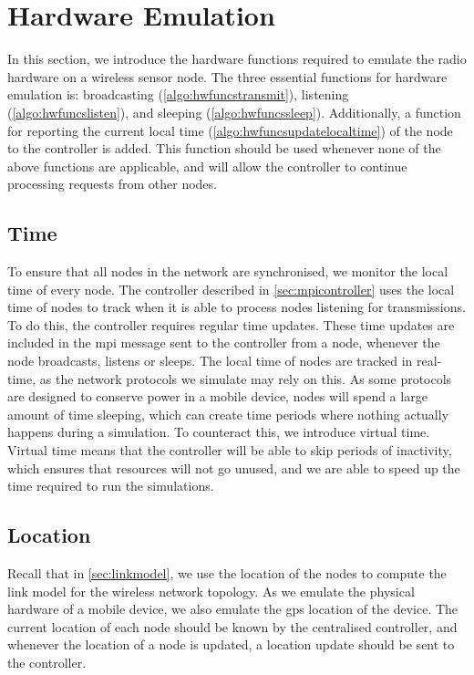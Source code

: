 \newpage
\section{Hardware Emulation}\label{sec:mpiprotocol}
In this section, we introduce the hardware functions required to emulate the radio hardware on a wireless sensor node. The three essential functions for hardware emulation is: broadcasting (\autoref{algo:hwfuncstransmit}), listening (\autoref{algo:hwfuncslisten}), and sleeping (\autoref{algo:hwfuncssleep}). Additionally, a function for reporting the current local time (\autoref{algo:hwfuncsupdatelocaltime}) of the node to the controller is added. This function should be used whenever none of the above functions are applicable, and will allow the controller to continue processing requests from other nodes.

\subsection{Time}\label{sec:mpi:time}
To ensure that all nodes in the network are synchronised, we monitor the local time of every node. The controller described in \autoref{sec:mpicontroller} uses the local time of nodes to track when it is able to process nodes listening for transmissions. To do this, the controller requires regular time updates. These time updates are included in the \acrshort{mpi} message sent to the controller from a node, whenever the node broadcasts, listens or sleeps. The local time of nodes are tracked in real-time, as the network protocols we simulate may rely on this. \smallbreak
As some protocols are designed to conserve power in a mobile device, nodes will spend a large amount of time sleeping, which can create time periods where nothing actually happens during a simulation. To counteract this, we introduce virtual time. Virtual time means that the controller will be able to skip periods of inactivity, which ensures that resources will not go unused, and we are able to speed up the time required to run the simulations.

\subsection{Location}\label{sec:mpinodelocation} %
Recall that in \autoref{sec:linkmodel}, we use the location of the nodes to compute the link model for the wireless network topology. As we emulate the physical hardware of a mobile device, we also emulate the \acrshort{gps} location of the device. The current location of each node should be known by the centralised controller, and whenever the location of a node is updated, a location update should be sent to the controller.

